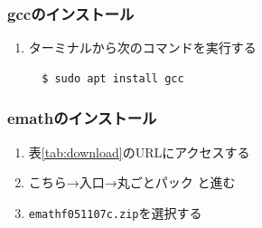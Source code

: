 \subsubsection{gccのインストール}
\begin{enumerate}
    \item ターミナルから次のコマンドを実行する
    \begin{lstlisting}
  $ sudo apt install gcc
    \end{lstlisting}
\end{enumerate}

\subsubsection{emathのインストール}
\begin{enumerate}
    \item 表\ref{tab:download}のURLにアクセスする
    \item こちら→入口→丸ごとパック と進む
    \item \verb|emathf051107c.zip|を選択する
\end{enumerate}
